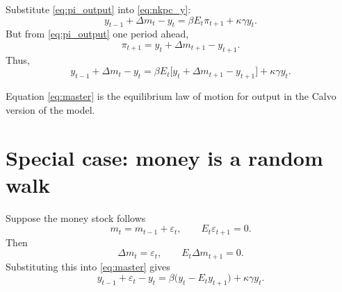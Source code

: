 \documentclass[11pt]{article}
\begin{document}
Substitute \eqref{eq:pi_output} into \eqref{eq:nkpc_y}:
\begin{equation}
y_{t-1} + \Delta m_t - y_t
=
\beta E_t\pi_{t+1} + \kappa\gamma y_t.
\end{equation}
But from \eqref{eq:pi_output} one period ahead,
\begin{equation}
\pi_{t+1} = y_t + \Delta m_{t+1} - y_{t+1}.
\end{equation}
Thus,
\begin{equation}
y_{t-1} + \Delta m_t - y_t
=
\beta E_t\bigl[y_t + \Delta m_{t+1} - y_{t+1}\bigr]
+
\kappa\gamma y_t.
\label{eq:master}
\end{equation}

Equation \eqref{eq:master} is the equilibrium law of motion for output in the Calvo version of the model.

\section{Special case: money is a random walk}

Suppose the money stock follows
\begin{equation}
m_t = m_{t-1} + \varepsilon_t,
\qquad
E_t\varepsilon_{t+1}=0.
\end{equation}
Then
\begin{equation}
\Delta m_t = \varepsilon_t,
\qquad
E_t\Delta m_{t+1}=0.
\end{equation}
Substituting this into \eqref{eq:master} gives
\begin{equation}
y_{t-1} + \varepsilon_t - y_t
=
\beta\bigl(y_t - E_t y_{t+1}\bigr)
+
\kappa\gamma y_t.
\label{eq:rw_equation}
\end{equation}
\end{document}
